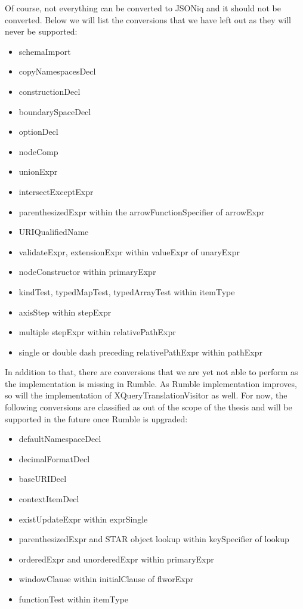 Of course, not everything can be converted to JSONiq and it should not be converted. Below we will list the conversions that we have left out as they will never be supported:
\begin{itemize}
	\item schemaImport
	\item copyNamespacesDecl
	\item constructionDecl
	\item boundarySpaceDecl
	\item optionDecl
	\item nodeComp
	\item unionExpr
	\item intersectExceptExpr
	\item parenthesizedExpr within the arrowFunctionSpecifier of arrowExpr
	\item URIQualifiedName
	\item validateExpr, extensionExpr within valueExpr of unaryExpr
	\item nodeConstructor within primaryExpr
	\item kindTest, typedMapTest, typedArrayTest within itemType
	\item axisStep within stepExpr
	\item multiple stepExpr within relativePathExpr
	\item single or double dash preceding relativePathExpr within pathExpr
\end{itemize}

In addition to that, there are conversions that we are yet not able to perform as the implementation is missing in Rumble. As Rumble implementation improves, so will the implementation of XQueryTranslationVisitor as well. For now, the following conversions are classified as out of the scope of the thesis and will be supported in the future once Rumble is upgraded:
\begin{itemize}
	\item defaultNamespaceDecl
	\item decimalFormatDecl
	\item baseURIDecl
	\item contextItemDecl
	\item existUpdateExpr within exprSingle
	\item parenthesizedExpr and STAR object lookup within keySpecifier of lookup
	\item orderedExpr and unorderedExpr within primaryExpr
	\item windowClause within initialClause of flworExpr
	\item functionTest within itemType
\end{itemize}

